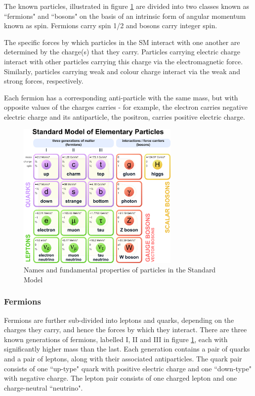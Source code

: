 \documentclass[12pt]{article}
\begin{document}
The known particles, illustrated in figure \ref{fig:standard_model} are divided into two classes known as ``fermions" and ``bosons" on the basis of an intrinsic form of angular momentum known as spin. Fermions carry spin 1/2 and bosons carry integer spin. 

The specific forces by which particles in the SM interact with one another are determined by the charge(s) that they carry. Particles carrying electric charge interact with other particles carrying this charge via the electromagnetic force. Similarly, particles carrying weak and colour charge interact via the weak and strong forces, respectively. 

Each fermion has a corresponding anti-particle with the same mass, but with opposite values of the charges carries - for example, the electron carries negative electric charge and its antiparticle, the positron, carries positive electric charge. 

\begin{figure}[H]
	\centering
	\includegraphics[width=0.7\textwidth]{figures/StandardModel.png}
	\caption[]{Names and fundamental properties of particles in the Standard Model}
	\label{fig:standard_model}
\end{figure}

\subsubsection{Fermions}

Fermions are further sub-divided into leptons and quarks, depending on the charges they carry, and hence the forces by which they interact. There are three known generations of fermions, labelled I, II and III in figure \ref{fig:standard_model}, each with significantly higher mass than the last. Each generation contains a pair of quarks and a pair of leptons, along with their associated antiparticles. The quark pair consists of one ``up-type" quark with positive electric charge and one ``down-type" with negative charge. The lepton pair consists of one charged lepton and one charge-neutral ``neutrino". 
\end{document}
